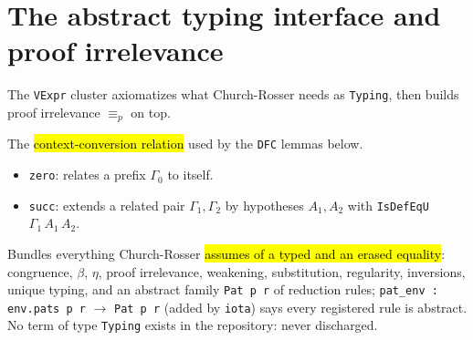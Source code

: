 \section{The abstract typing interface and proof irrelevance}

The \texttt{VExpr} cluster axiomatizes what Church-Rosser needs as \texttt{Typing}, then builds
proof irrelevance $\equiv_p$ on top.

\begin{definition}
\label{inductive:expb-isdefeqctx}
\leanok
{}

 The \hl{context-conversion relation} used by the \texttt{DFC} lemmas below.
\begin{itemize}
\item \texttt{zero}: relates a prefix $\Gamma_0$ to itself.
\item \texttt{succ}: extends a related pair $\Gamma_1,\Gamma_2$ by hypotheses $A_1,A_2$ with
\texttt{IsDefEqU}~$\Gamma_1\,A_1\,A_2$.
\end{itemize}
\end{definition}

\begin{definition}
\label{structure:expb-typing}
\leanok
{}

 Bundles everything Church-Rosser \hl{assumes of a typed and an erased equality}:
congruence, $\beta$, $\eta$, proof irrelevance, weakening, substitution, regularity, inversions,
unique typing, and an abstract family \texttt{Pat p r} of reduction rules; \texttt{pat\_env :
env.pats p r} $\to$ \texttt{Pat p r} (added by \texttt{iota}) says every registered rule is
abstract.
 No term of type \texttt{Typing} exists in the repository: never discharged.
\end{definition}

